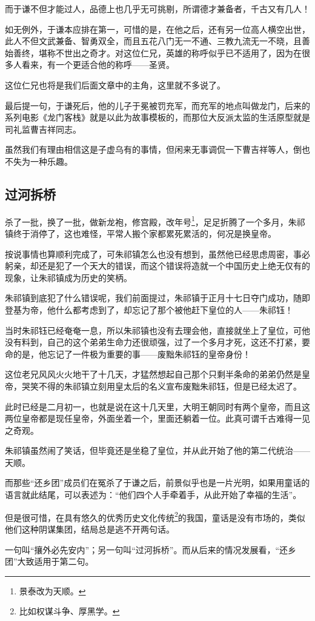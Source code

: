 \begin{multicols}{\theparacolNo}
		而于谦不但才能过人，品德上也几乎无可挑剔，所谓德才兼备者，千古又有几人！

		如无例外，于谦本应排在第一，可惜的是，在他之后，还有另一位高人横空出世，此人不但文武兼备、智勇双全，而且五花八门无一不通、三教九流无一不晓，且善始善终，堪称不世出之奇才。对这位仁兄，英雄的称呼似乎已不适用了，因为在很多人看来，有一个更适合他的称呼——圣贤。

		这位仁兄也将是我们后面文章中的主角，这里就不多说了。

		最后提一句，于谦死后，他的儿子于冕被罚充军，而充军的地点叫做龙门，后来的系列电影《龙门客栈》就是以此为故事模板的，而那位大反派太监的生活原型就是司礼监曹吉祥同志。

		虽然我们有理由相信这是子虚乌有的事情，但闲来无事调侃一下曹吉祥等人，倒也不失为一种乐趣。

		\subsection{过河拆桥}
		杀了一批，换了一批，做新龙袍，修宫殿，改年号\footnote{景泰改为天顺。}，足足折腾了一个多月，朱祁镇终于消停了，这也难怪，平常人搬个家都累死累活的，何况是换皇帝。

		按说事情也算顺利完成了，可朱祁镇怎么也没有想到，虽然他已经思虑周密，事必躬亲，却还是犯了一个天大的错误，而这个错误将造就一个中国历史上绝无仅有的现象，让朱祁镇成为历史的笑柄。

		朱祁镇到底犯了什么错误呢，我们前面提过，朱祁镇于正月十七日夺门成功，随即登基为帝，他什么都考虑到了，却忘记了那个被他赶下皇位的人——朱祁钰！

		当时朱祁钰已经奄奄一息，所以朱祁镇也没有去理会他，直接就坐上了皇位，可他没有料到，自己的这个弟弟生命力还很顽强，过了一个多月才死，这还不打紧，要命的是，他忘记了一件极为重要的事——废黜朱祁钰的皇帝身份！

		这位老兄风风火火地干了十几天，才猛然想起自己那个只剩半条命的弟弟仍然是皇帝，哭笑不得的朱祁镇立刻用皇太后的名义宣布废黜朱祁钰，但是已经太迟了。

		此时已经是二月初一，也就是说在这十几天里，大明王朝同时有两个皇帝，而且这两位皇帝都是现任皇帝，外面坐着一个，里面还躺着一位。此真可谓千古难得一见之奇观。

		朱祁镇虽然闹了笑话，但毕竟还是坐稳了皇位，并从此开始了他的第二代统治——天顺。

		而那些“还乡团”成员们在冤杀了于谦之后，前景似乎也是一片光明，如果用童话的语言就此结尾，可以表述为：“他们四个人手牵着手，从此开始了幸福的生活”。

		但是很可惜，在具有悠久的优秀历史文化传统\footnote{比如权谋斗争、厚黑学。}的我国，童话是没有市场的，类似他们这种阴谋集团，结局总是逃不开两句话。

		一句叫“攘外必先安内”；另一句叫“过河拆桥”。而从后来的情况发展看，“还乡团”大致适用于第二句。
		\ifnum{}
	\end{multicols}
\fi
\newpage
